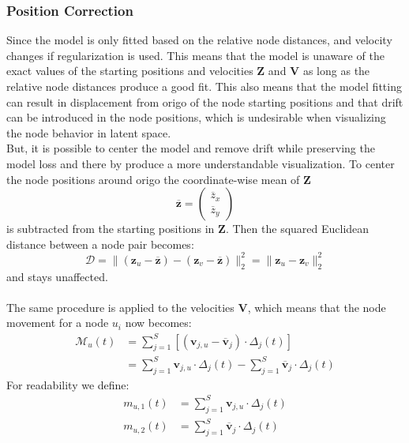 \subsubsection{Position Correction}
\label{sec:Method:ProposedModel:PositionCorrection}
Since the model is only fitted based on the relative node distances, and velocity changes if regularization is used. This means that the model is unaware of the exact values of the starting positions and velocities $\textbf{Z}$ and $\textbf{V}$ as long as the relative node distances produce a good fit. This also means that the model fitting can result in displacement from origo of the node starting positions and that drift can be introduced in the node positions, which is undesirable when visualizing the node behavior in latent space.
\\
But, it is possible to center the model and remove drift while preserving the model loss and there by produce a more understandable visualization. 
To center the node positions around origo the coordinate-wise mean of $\textbf{Z}$
\begin{equation}
        \overline{\textbf{z}} = 
    \begin{pmatrix}
        \overline{z}_x \\
        \overline{z}_y
    \end{pmatrix}
\end{equation}
is subtracted from the starting positions in $\textbf{Z}$. Then the squared Euclidean distance between a node pair becomes:
\begin{equation}
    \mathcal{D} =\rVert (\textbf{z}_u-\overline{\textbf{z}}) - (\textbf{z}_v-\overline{\textbf{z}}) \rVert_2^2 = 
    \rVert \textbf{z}_u - \textbf{z}_v \rVert_2^2 
\end{equation}
and stays unaffected.
\\\\
The same procedure is applied to the velocities $\textbf{V}$, which means that the node movement for a node $u_i$ now becomes:
\begin{align}
    \mathcal{M}_{u}(t) &= \sum_{j=1}^S \left[(\textbf{v}_{j,u} - \overline{\textbf{v}}_j) \cdot \Delta_{j}(t) \right] \\
    &= \sum_{j=1}^S \textbf{v}_{j, u} \cdot \Delta_{j}(t) - \sum_{j=1}^S \overline{\textbf{v}}_j \cdot \Delta_{j}(t)
\end{align}
For readability we define:
\begin{align}
    m_{u,1}(t) &=  \sum_{j=1}^S \textbf{v}_{j, u} \cdot \Delta_{j}(t) \\
    m_{u,2}(t) &= \sum_{j=1}^S \overline{\textbf{v}}_j \cdot \Delta_{j}(t)
\end{align}

